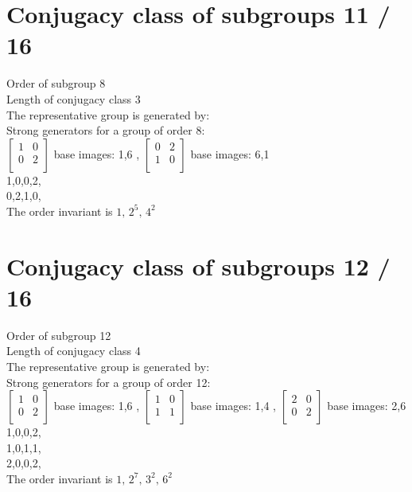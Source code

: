 \section{Conjugacy class of subgroups 11 / 16}
Order of subgroup 8\\
Length of conjugacy class 3\\
The representative group is generated by:\\
Strong generators for a group of order 8:\\
$
\left[
\begin{array}{*{2}{r}}
1 & 0\\
0 & 2\\
\end{array}
\right]
$
base images: 1,6 , 
$
\left[
\begin{array}{*{2}{r}}
0 & 2\\
1 & 0\\
\end{array}
\right]
$
base images: 6,1 \\
1,0,0,2,\\
0,2,1,0,\\
The order invariant is $1,\,2^5,\,4^2$\\
\section{Conjugacy class of subgroups 12 / 16}
Order of subgroup 12\\
Length of conjugacy class 4\\
The representative group is generated by:\\
Strong generators for a group of order 12:\\
$
\left[
\begin{array}{*{2}{r}}
1 & 0\\
0 & 2\\
\end{array}
\right]
$
base images: 1,6 , 
$
\left[
\begin{array}{*{2}{r}}
1 & 0\\
1 & 1\\
\end{array}
\right]
$
base images: 1,4 , 
$
\left[
\begin{array}{*{2}{r}}
2 & 0\\
0 & 2\\
\end{array}
\right]
$
base images: 2,6 \\
1,0,0,2,\\
1,0,1,1,\\
2,0,0,2,\\
The order invariant is $1,\,2^7,\,3^2,\,6^2$\\
